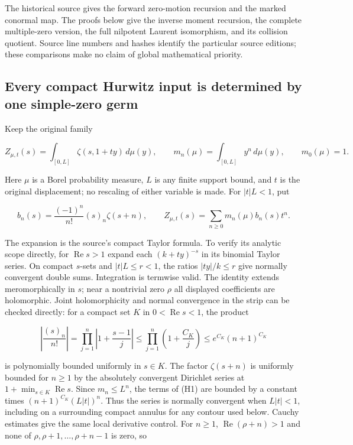 The historical source gives the forward zero-motion recursion and the marked conormal map. The proofs below give the inverse moment recursion, the complete multiple-zero version, the full nilpotent Laurent isomorphism, and its collision quotient. Source line numbers and hashes identify the particular source editions; these comparisons make no claim of global mathematical priority.

\subsection{Every compact Hurwitz input is determined by one simple-zero germ}\label{every-compact-hurwitz-input-is-determined-by-one-simple-zero-germ}

Keep the original family

\[
Z_{\mu,t}(s)=\int_{[0,L]}\zeta(s,1+ty)\,d\mu(y),\qquad
m_n(\mu)=\int_{[0,L]}y^n\,d\mu(y),\qquad m_0(\mu)=1.
\]

Here \(\mu\) is a Borel probability measure, \(L\) is any finite support bound, and \(t\) is the original displacement; no rescaling of either variable is made. For \(|t|L<1\), put

\[
b_n(s)=\frac{(-1)^n}{n!}(s)_n\zeta(s+n),\qquad
Z_{\mu,t}(s)=\sum_{n\ge0}m_n(\mu)b_n(s)t^n.
\tag{H1}
\]

The expansion is the source's compact Taylor formula. To verify its analytic scope directly, for \(\operatorname{Re} s>1\) expand each \((k+ty)^{-s}\) in its binomial Taylor series. On compact \(s\)-sets and \(|t|L\le r<1\), the ratios \(|ty|/k\le r\) give normally convergent double sums. Integration is termwise valid. The identity extends meromorphically in \(s\); near a nontrivial zero \(\rho\) all displayed coefficients are holomorphic. Joint holomorphicity and normal convergence in the strip can be checked directly: for a compact set \(K\) in \(0<\operatorname{Re} s<1\), the product

\[
\left|\frac{(s)_n}{n!}\right|
=\prod_{j=1}^n\left|1+\frac{s-1}{j}\right|
\le\prod_{j=1}^n\left(1+\frac{C_K}{j}\right)
\le e^{C_K}(n+1)^{C_K}
\]

is polynomially bounded uniformly in \(s\in K\). The factor \(\zeta (s+n)\) is uniformly bounded for \(n\ge 1\) by the absolutely convergent Dirichlet series at \(1+\min_{s\in K}\operatorname{Re} s\). Since \(m_n\le L^n\), the terms of (H1) are bounded by a constant times \((n+1)^{C_K}(L|t|)^n\). Thus the series is normally convergent when \(L|t|<1\), including on a surrounding compact annulus for any contour used below. Cauchy estimates give the same local derivative control. For \(n\ge 1\), \(\operatorname{Re}(\rho +n)>1\) and none of \(\rho ,\rho +1,\ldots ,\rho +n-1\) is zero, so

